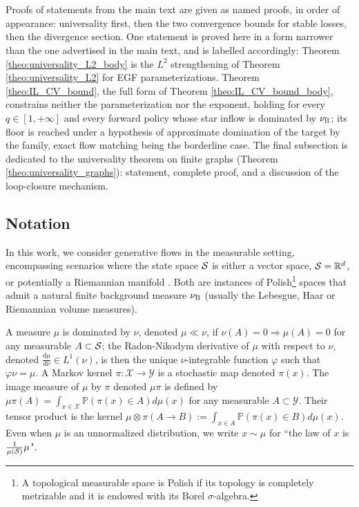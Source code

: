 \appendix
\section{\appendixAtitle}

Proofs of statements from the main text are given as named proofs, in order of appearance: universality first, then the two convergence bounds for stable losses, then the divergence section. One statement is proved here in a form narrower than the one advertised in the main text, and is labelled accordingly: Theorem \ref{theo:universality_L2_body} is the $L^2$ strengthening of Theorem \ref{theo:universality_L2} for EGF parameterizations. Theorem \ref{theo:IL_CV_bound}, the full form of Theorem \ref{theo:IL_CV_bound_body}, constrains neither the parameterization nor the exponent, holding for every $q\in[1,+\infty]$ and every forward policy whose star inflow is dominated by $\nu_{\mathrm{B}}$; its floor is reached under a hypothesis of approximate domination of the target by the family, exact flow matching being the borderline case. The final subsection is dedicated to the universality theorem on finite graphs (Theorem \ref{theo:universality_graphs}): statement, complete proof, and a discussion of the loop-closure mechanism.

\subsection{Notation}\label{app:notation}

In this work, we consider generative flows in the measurable setting, encompassing scenarios where the state space $\mathcal S$ is either a vector space, $\mathcal S = \mathbb R^d$, or potentially a Riemannian manifold \cite{lee2018introduction, gemici2016normalizing}. Both are instances of Polish\footnote{A topological measurable space is Polish if its topology is completely metrizable and it is endowed with its Borel $\sigma$-algebra.} spaces that admit a natural finite background measure $\nu_{\mathrm{B}}$ (usually the Lebesgue, Haar \cite{halmos2013measureHaar} or Riemannian volume measures).

    A measure $\mu$ is dominated by $\nu$, denoted $\mu\ll \nu$, if $\nu(A)=0 \Rightarrow \mu(A)=0$ for any measurable $A\subset \mathcal S$; the Radon-Nikodym derivative of $\mu$ with respect to $\nu$, denoted $\frac{d\mu}{d\nu}\in L^1(\nu)$, is then the unique $\nu$-integrable function $\varphi$ such that $\varphi \nu = \mu$. A
    Markov kernel $\pi:\mathcal X\rightarrow \mathcal Y$ is a stochastic map denoted $\pi(x)$. The image measure of $\mu$ by $\pi$ denoted $\mu \pi$ is defined by $\mu\pi(A) = \int_{x\in \mathcal X} \mathbb P(\pi(x)\in A) d\mu(x)$ for any measurable $A\subset \mathcal Y$. Their tensor product is the kernel  $\mu\otimes \pi(A\rightarrow B):=\int_{x\in A}\mathbb P(\pi(x)\in B)d\mu(x)$.
    Even when $\mu$ is an unnormalized distribution, we write $x\sim \mu$ for ``the law of $x$ is $\frac{1}{\mu(\mathcal S)}\mu$".

